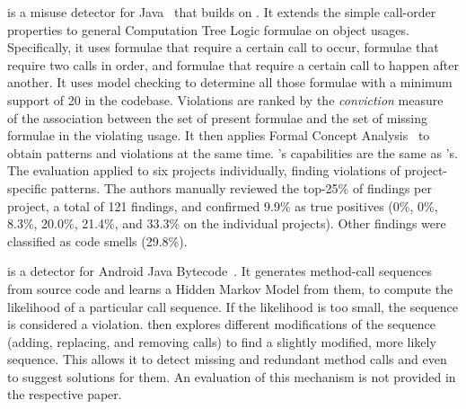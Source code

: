 \Tikanga is a misuse detector for Java~\cite{WZ11} that builds on
\Jadet.
It extends the simple call-order properties
to general Computation Tree Logic
formulae on object usages.
Specifically, it uses formulae that require a certain call to occur,
formulae that require two calls in
order, and formulae that require a certain call to happen after another.
It uses model checking to determine
all those formulae with a minimum support of 20 in the codebase.
Violations are ranked by the \emph{conviction} measure~\cite{BMUT97} of the association between the set of present formulae and the set of missing formulae in the violating usage.
It then applies Formal Concept Analysis~\cite{GW99} to obtain patterns and violations at the same time.
\Tikanga's capabilities are the same as \Jadet's.
The evaluation applied \Tikanga to six projects individually, finding violations of project-specific patterns.
The authors manually reviewed the top-25\% of findings per project, a total of 121 findings, and confirmed 9.9\% as true positives (0\%, 0\%, 8.3\%, 20.0\%, 21.4\%, and 33.3\% on the individual projects).
Other findings were classified as code smells (29.8\%).

\vspace{0.03in}

\DroidAssist is a detector for Android Java Bytecode~\cite{NPVN16}.
It generates method-call sequences from source code and learns a Hidden Markov Model from them, %
%
to compute the likelihood of a particular call sequence.
If the likelihood is too small, the sequence is considered a violation.
\DroidAssist then explores different modifications of the sequence (adding, replacing, and removing calls) to find a slightly modified, more likely sequence.
This allows it to detect missing and redundant method calls and even to suggest solutions for them.
%
An evaluation of this mechanism is not provided in the respective paper.

